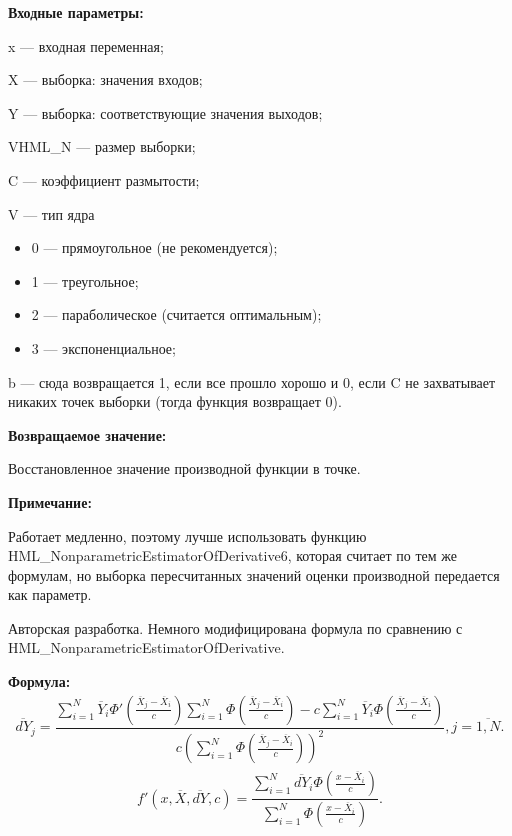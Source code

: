 \textbf{Входные параметры:} 
 
x --- входная переменная;
 
X --- выборка: значения входов;
 
Y --- выборка: соответствующие значения выходов;
 
VHML\_N --- размер выборки;
 
C --- коэффициент размытости;
 
V --- тип ядра
 
 \begin{itemize}
 \item  0 --- прямоугольное (не рекомендуется);
 \item  1 --- треугольное;
 \item  2 --- параболическое (считается оптимальным);
 \item  3 --- экспоненциальное;
 \end{itemize}
 
b --- сюда возвращается 1, если все прошло хорошо и 0, если C не захватывает никаких точек выборки (тогда функция возвращает 0).

\textbf{Возвращаемое значение:}
 
 Восстановленное значение производной функции в точке.
 
\textbf{Примечание:}

Работает медленно, поэтому лучше использовать функцию HML\_NonparametricEstimatorOfDerivative6, которая считает по тем же формулам, но выборка пересчитанных значений оценки производной передается как параметр.

Авторская разработка. Немного модифицирована формула по сравнению с HML\_NonparametricEstimatorOfDerivative.

\textbf{Формула:}
\begin{eqnarray*}
\overline{dY}_j =\dfrac{\sum_{i=1}^{N}\overline{Y}_i{\Phi}'\left( \frac{\overline{X}_j-\overline{X}_i}{c}\right) \sum_{i=1}^{N}\Phi\left( \frac{\overline{X}_j-\overline{X}_i}{c}\right)-c \sum_{i=1}^{N}\overline{Y}_i\Phi\left( \frac{\overline{X}_j-\overline{X}_i}{c}\right)}{c\left( \sum_{i=1}^{N}\Phi\left( \frac{\overline{X}_j-\overline{X}_i}{c}\right)\right)^2 }, j=\overline{1,N}.
\end{eqnarray*}
\begin{eqnarray*}
{f}'\left( x, \overline{X},\overline{dY}, c\right) =\dfrac{\sum_{i=1}^{N}\overline{dY}_i\Phi\left( \frac{x-\overline{X}_i}{c}\right) }{\sum_{i=1}^{N}\Phi\left( \frac{x-\overline{X}_i}{c}\right) }.
\end{eqnarray*}

